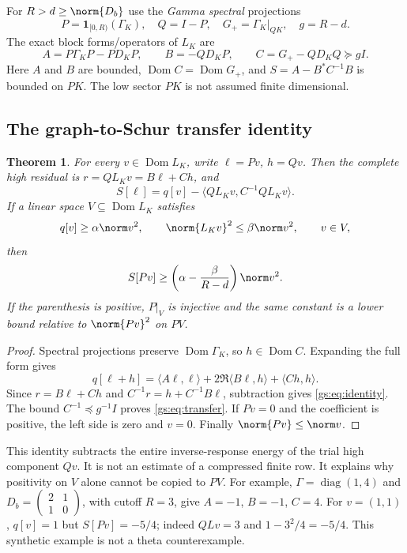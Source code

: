 \documentclass[11pt,a4paper]{article}
\numberwithin{equation}{section}
\newtheorem{theorem}{Theorem}[section]
\theoremstyle{definition}\newtheorem{definition}[theorem]{Definition}
\theoremstyle{remark}\newtheorem{remark}[theorem]{Remark}
\begin{document}
For $R>d\ge\norm{D_b}$ use the \emph{Gamma spectral} projections
\[
 P=\mathbf1_{[0,R)}(\Gamma_K),\quad Q=I-P,
 \quad G_+=\Gamma_K|_{QK},\quad g=R-d.
\]
The exact block forms/operators of $L_K$ are
\[
 A=P\Gamma_KP-PD_KP,\qquad B=-QD_KP,\qquad
 C=G_+-QD_KQ\succeq gI.
\]
Here $A$ and $B$ are bounded, $\operatorname{Dom}C=\operatorname{Dom}G_+$,
and $S=A-B^*C^{-1}B$ is bounded on $PK$.
The low sector $PK$ is not assumed finite dimensional.

\subsection{The graph-to-Schur transfer identity}
\begin{theorem}\label{gs:thm:transfer}
For every $v\in\operatorname{Dom}L_K$, write $\ell=Pv$, $h=Qv$.
Then the complete high residual is $r=QL_Kv=B\ell+Ch$, and
\begin{equation}\label{gs:eq:identity}
 \boxed{S[\ell]=q[v]-\langle QL_Kv,C^{-1}QL_Kv\rangle.}
\end{equation}
If a linear space $V\subseteq\operatorname{Dom}L_K$ satisfies
\[
 q[v]\ge\alpha\norm v^2,\qquad\norm{L_Kv}^2\le\beta\norm v^2,
 \qquad v\in V,
\]
then
\begin{equation}\label{gs:eq:transfer}
 S[Pv]\ge\left(\alpha-\frac\beta{R-d}\right)\norm v^2.
\end{equation}
If the parenthesis is positive, $P|_V$ is injective and the same constant
is a lower bound relative to $\norm{Pv}^2$ on $PV$.
\end{theorem}
\begin{proof}
Spectral projections preserve $\operatorname{Dom}\Gamma_K$, so
$h\in\operatorname{Dom}C$. Expanding the full form gives
\[
 q[\ell+h]=\langle A\ell,\ell\rangle
 +2\Re\langle B\ell,h\rangle+\langle Ch,h\rangle.
\]
Since $r=B\ell+Ch$ and $C^{-1}r=h+C^{-1}B\ell$, subtraction gives
\eqref{gs:eq:identity}. The bound $C^{-1}\preceq g^{-1}I$ proves
\eqref{gs:eq:transfer}. If $Pv=0$ and the coefficient is positive, the
left side is zero and $v=0$. Finally $\norm{Pv}\le\norm v$.
\end{proof}

This identity subtracts the entire inverse-response energy of the trial
high component $Qv$. It is not an estimate of a compressed finite row.
It explains why positivity on $V$ alone cannot be copied to $PV$.
For example, $\Gamma=\operatorname{diag}(1,4)$ and
$D_b=\left(\begin{smallmatrix}2&1\\1&0\end{smallmatrix}\right)$, with
cutoff $R=3$, give $A=-1$, $B=-1$, $C=4$.
For $v=(1,1)$, $q[v]=1$ but $S[Pv]=-5/4$; indeed $QLv=3$ and
$1-3^2/4=-5/4$. This synthetic example is not a theta counterexample.
\end{document}
